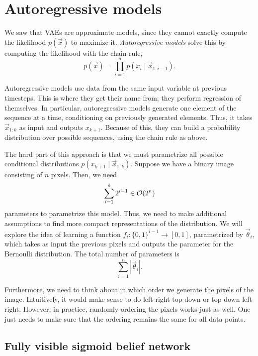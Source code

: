 \section{Autoregressive models}

We saw that VAEs are approximate models, since they cannot exactly compute the likelihood
$p(\vec{x})$ to maximize it. \textit{Autoregressive models} solve this by computing the likelihood
with the chain rule, \[
    p(\vec{x}) = \prod_{i=1}^{n} p(x_i\mid \vec{x}_{1:i-1}).
\]

Autoregressive models use data from the same input variable at previous timesteps. This is where
they get their name from; they perform regression of themselves. In particular, autoregressive
models generate one element of the sequence at a time, conditioning on previously generated
elements. Thus, it takes $\vec{x}_{1:k}$ as input and outputs $x_{k+1}$. Because of this, they can
build a probability distribution over possible sequences, using the chain rule as above.

The hard part of this approach is that we must parametrize all possible conditional distributions
$p(x_{k+1} \mid \vec{x}_{1:k})$. Suppose we have a binary image consisting of $n$ pixels. Then, we
need \[
    \sum_{i=1}^{n} 2^{i-1} \in \bigo{2^n}
\]
parameters to parametrize this model. Thus, we need to make additional assumptions to find more
compact representations of the distribution. We will explore the idea of learning a function
$f_i: \{ 0,1 \}^{i-1} \to [0,1]$, parametrized by $\vec{\theta}_i$, which takes as input the
previous pixels and outputs the parameter for the Bernoulli distribution. The total number of
parameters is \[
    \sum_{i=1}^{n} |\vec{\theta}_i|.
\]

Furthermore, we need to think about in which order we generate the pixels of the image.
Intuitively, it would make sense to do left-right top-down or top-down left-right. However, in
practice, randomly ordering the pixels works just as well. One just needs to make sure that the
ordering remains the same for all data points.

\subsection{Fully visible sigmoid belief network}

